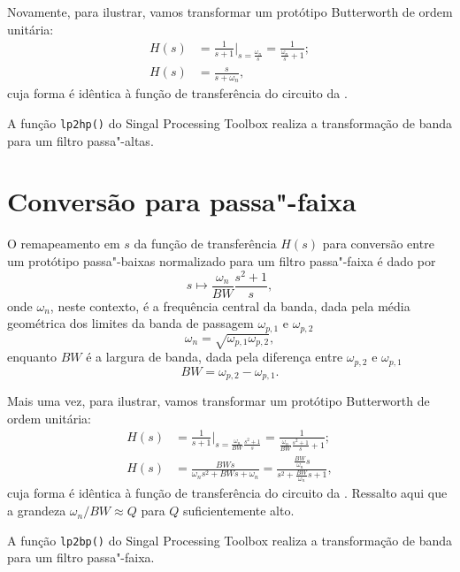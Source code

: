 Novamente, para ilustrar, vamos transformar um protótipo Butterworth de ordem unitária:
\begin{align*}
	H(s)&=\frac{1}{s+1}\Bigg|_{s=\frac{\omega_n}{s}}=\frac{1}{\displaystyle\frac{\omega_n}{s}+1};\\
	H(s)&=\frac{s}{s+\omega_n},
\end{align*}
cuja forma é idêntica à função de transferência do circuito da .

A função \lstinline{lp2hp()} do Singal Processing Toolbox realiza a transformação de banda para um filtro passa"-altas.

\section{Conversão para passa"-faixa}

O remapeamento em $s$ da função de transferência $H(s)$ para conversão entre um protótipo passa"-baixas normalizado para um filtro passa"-faixa é dado por
\begin{equation}
	s\mapsto\frac{\omega_n}{BW}\frac{s^2+1}{s},
\end{equation}
onde $\omega_n$, neste contexto, é a frequência central da banda, dada pela média geométrica dos limites da banda de passagem $\omega_{p,1}$ e $\omega_{p,2}$
\begin{equation}
	\omega_n=\sqrt{\omega_{p,1}\omega_{p,2}},
\end{equation}
enquanto $BW$ é a largura de banda, dada pela diferença entre $\omega_{p,2}$ e $\omega_{p,1}$
\begin{equation}
	BW=\omega_{p,2}-\omega_{p,1}.
\end{equation}

Mais uma vez, para ilustrar, vamos transformar um protótipo Butterworth de ordem unitária:
\begin{align*}
	H(s)&=\frac{1}{s+1}\Bigg|_{s=\frac{\omega_n}{BW}\frac{s^2+1}{s}}=\frac{1}{\displaystyle\frac{\omega_n}{BW}\frac{s^2+1}{s}+1};\\
	H(s)&=\frac{BWs}{\omega_ns^2+BWs+\omega_n}=\frac{\displaystyle\frac{BW}{\omega_n}s}{\displaystyle s^2+\frac{BW}{\omega_n}s+1},
\end{align*}
cuja forma é idêntica à função de transferência do circuito da . Ressalto aqui que a grandeza $\omega_n\slash BW\approx Q$ para $Q$ suficientemente alto.

A função \lstinline{lp2bp()} do Singal Processing Toolbox realiza a transformação de banda para um filtro passa"-faixa.

